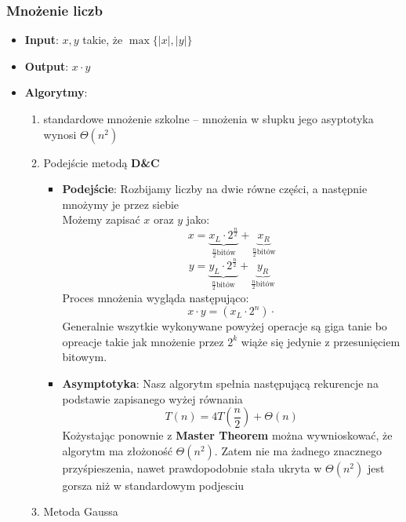 \documentclass[11pt,a4paper]{article}
\begin{document}
\subsubsection{Mnożenie liczb}
\begin{itemize}
    \item \textbf{Input}: $x, y$ takie, że $\max\{|x|, |y|\}$
    \item \textbf{Output}: $x \cdot y$
    \item \textbf{Algorytmy}:
        \begin{enumerate}
            \item standardowe mnożenie szkolne -- mnożenia w słupku jego asyptotyka wynosi $\Theta(n^2)$
            \item Podejście metodą \textbf{D\&C}
                \begin{itemize}
                    \item \textbf{Podejście}: Rozbijamy liczby na dwie równe części, a następnie mnożymy je przez siebie \\
                        Możemy zapisać $x$ oraz $y$ jako:
                        \[
                            x = \underbrace{x_L \cdot 2^{\frac{n}{2}}}_{\frac{n}{2} \text{bitów}} +\underbrace{x_R}_{\frac{n}{2} \text{bitów}}
                        \]
                        \[
                            y = \underbrace{y_L \cdot 2^{\frac{n}{2}}}_{\frac{n}{2} \text{bitów}} +\underbrace{y_R}_{\frac{n}{2} \text{bitów}}
                        \]
                        Proces mnożenia wygląda następująco:
                        \[
                            x \cdot y = (x_L \cdot 2^n) \cdot  %
                        \]
                        Generalnie wszytkie wykonywane powyżej operacje są giga tanie bo opreacje takie jak mnożenie przez $2^k$ wiąże się jedynie z przesunięciem bitowym.
                    \item \textbf{Asymptotyka}: Nasz algorytm spełnia następującą rekurencje na podstawie zapisanego wyżej równania
                        \[
                            T(n) = 4T(\frac{n}{2}) + \Theta(n)
                        \]
                        Kożystając ponownie z \textbf{Master Theorem} można wywnioskować, że algorytm ma złożoność $\Theta(n^2)$. Zatem nie ma żadnego znacznego przyśpieszenia, nawet prawdopodobnie stała ukryta w $\Theta(n^2)$ jest gorsza niż w standardowym podjesciu
                \end{itemize}
            \item Metoda Gaussa

\end{enumerate}
\end{itemize}
\end{document}
